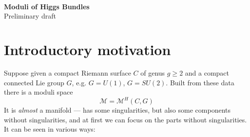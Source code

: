\documentclass[12pt,letterpaper,reqno]{amsart}
\numberwithin{equation}{section}
\newcommand{\cM}{\ensuremath{\mathcal M}}
\newcommand{\ti}[1]{\textit{#1}}
\begin{document}
\setcounter{page}{1}

{\noindent \tiny \color{gray} \tt \gitAuthorIsoDate \hfill
\gitAbbrevHash}

\begin{center} 
{\textbf {{Moduli of Higgs Bundles}}} \\
Preliminary draft
\end{center}

\section{Introductory motivation}

Suppose given a compact Riemann surface $C$
of genus $g \ge 2$ and a compact connected 
Lie group $G$, e.g. $G = U(1)$, $G = SU(2)$. 
Built from these data there is a
moduli space $$\cM = \cM^H(C,G)$$
It is \ti{almost} a manifold --- has some singularities, but also
some components without singularities, and at first we can focus
on the parts without singularities.
It can be seen in various ways:
\end{document}
